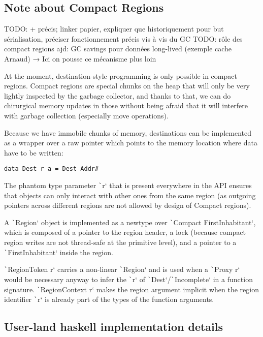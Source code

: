 \documentclass[english]{jflart}
\begin{document}
\subsection{Note about Compact Regions}

TODO: + précis; linker papier, expliquer que historiquement pour but sérialisation, préciser fonctionnement précis vis à vis du GC
TODO: rôle des compact regions ajd: GC savings pour données long-lived (exemple cache Arnaud) → Ici on pousse ce mécanisme plus loin

At the moment, destination-style programming is only possible in compact regions. Compact regions are special chunks on the heap that will only be very lightly inspected by the garbage collector, and thanks to that, we can do chirurgical memory updates in those without being afraid that it will interfere with garbage collection (especially move operations).

Because we have immobile chunks of memory, destinations can be implemented as a wrapper over a raw pointer which points to the memory location where data have to be written:

{\small
\begin{verbatim}
data Dest r a = Dest Addr#
\end{verbatim}
}

The phantom type parameter \texttt`r` that is present everywhere in the API ensures that objects can only interact with other ones from the same region (as outgoing pointers across different regions are not allowed by design of Compact regions).

A \texttt`Region` object is implemented as a newtype over \texttt`Compact FirstInhabitant`, which is composed of a pointer to the region header, a lock (because compact region writes are not thread-safe at the primitive level), and a pointer to a \texttt`FirstInhabitant` inside the region.

\texttt`RegionToken r` carries a non-linear \texttt`Region` and is used when a \texttt`Proxy r` would be necessary anyway to infer the \texttt`r` of \texttt`Dest`/\texttt`Incomplete` in a function signature. \texttt`RegionContext r` makes the region argument implicit when the region identifier \texttt`r` is already part of the types of the function arguments.

\subsection{User-land haskell implementation details}
 
\end{document}
